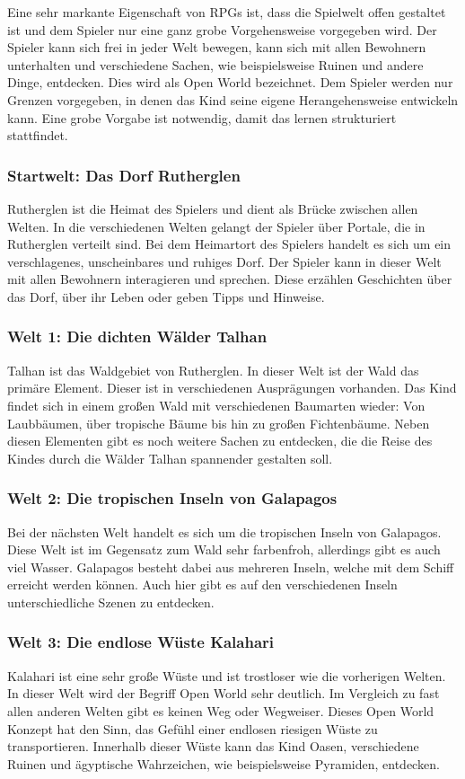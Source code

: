 Eine sehr markante Eigenschaft von \acp{RPG} ist, dass die Spielwelt offen gestaltet ist und dem Spieler nur eine ganz grobe Vorgehensweise vorgegeben wird. Der Spieler kann sich frei in  jeder Welt bewegen, kann sich mit allen Bewohnern unterhalten und verschiedene Sachen, wie beispielsweise Ruinen und andere Dinge, entdecken. Dies wird als Open World bezeichnet. Dem Spieler werden nur Grenzen vorgegeben, in denen das Kind seine eigene Herangehensweise entwickeln kann. Eine grobe Vorgabe ist notwendig, damit das lernen strukturiert stattfindet.

\subsubsection{Startwelt: Das Dorf Rutherglen}
	Rutherglen ist die Heimat des Spielers und dient als Brücke zwischen allen Welten. In die verschiedenen Welten gelangt der Spieler über Portale, die in Rutherglen verteilt sind. Bei dem Heimartort des Spielers handelt es sich um ein verschlagenes, unscheinbares und ruhiges Dorf. Der Spieler kann in dieser Welt mit allen Bewohnern interagieren und sprechen. Diese erzählen Geschichten über das Dorf, über ihr Leben oder geben Tipps und Hinweise.
	
\subsubsection{Welt 1: Die dichten Wälder Talhan}
	Talhan ist das Waldgebiet von Rutherglen. In dieser Welt ist der Wald das primäre Element. Dieser ist in verschiedenen Ausprägungen vorhanden. Das Kind findet sich in einem großen Wald mit verschiedenen Baumarten wieder: Von Laubbäumen, über tropische Bäume bis hin zu großen Fichtenbäume. Neben diesen Elementen gibt es noch weitere Sachen zu entdecken, die die Reise des Kindes durch die Wälder Talhan spannender gestalten soll.
	
\subsubsection{Welt 2: Die tropischen Inseln von Galapagos}
	Bei der nächsten Welt handelt es sich um die tropischen Inseln von Galapagos. Diese Welt ist im Gegensatz zum Wald sehr farbenfroh, allerdings gibt es auch viel Wasser. Galapagos besteht dabei aus mehreren Inseln, welche mit dem Schiff erreicht werden können. Auch hier gibt es auf den verschiedenen Inseln unterschiedliche Szenen zu entdecken.
	
\subsubsection{Welt 3: Die endlose Wüste Kalahari}
	Kalahari ist eine sehr große Wüste und ist trostloser wie die vorherigen Welten. In dieser Welt wird der Begriff Open World sehr deutlich. Im Vergleich zu fast allen anderen Welten gibt es keinen Weg oder Wegweiser. Dieses Open World Konzept hat den Sinn, das Gefühl einer endlosen riesigen Wüste zu transportieren. Innerhalb dieser Wüste kann das Kind Oasen, verschiedene Ruinen und ägyptische Wahrzeichen, wie beispielsweise Pyramiden, entdecken.
	
